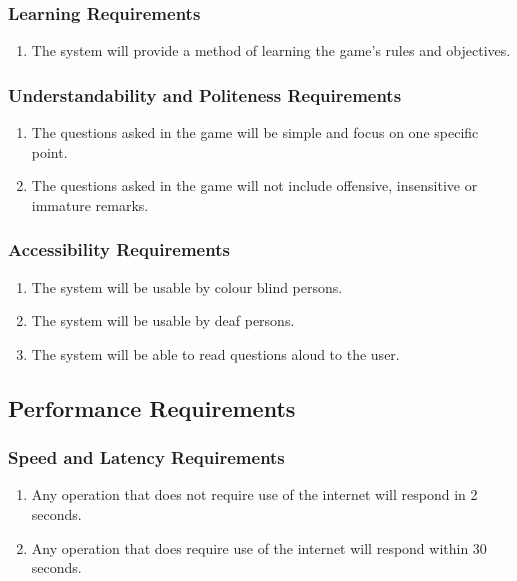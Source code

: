 \documentclass[titlepage]{article}
\begin{document}
\subsubsection{Learning Requirements}
\label{ssub:learning_requirements}
\begin{enumerate}[{UH}1. ]
	\item
	The system will provide a method of learning the game's rules and objectives.
\end{enumerate}

\subsubsection{Understandability and Politeness Requirements}
\label{ssub:understandability_and_politeness_requirements}
\begin{enumerate}[{UH}1. ]
	\item 
	The questions asked in the game will be simple and focus on one specific point. %
	\item
	The questions asked in the game will not include offensive, insensitive or immature remarks.
\end{enumerate}

\subsubsection{Accessibility Requirements}
\label{ssub:accessibility_requirements}
\begin{enumerate}[{UH}1. ]
	\item 
	The system will be usable by colour blind persons.
	\item
	The system will be usable by deaf persons.
	\item
	The system will be able to read questions aloud to the user.
\end{enumerate}


\subsection{Performance Requirements}
\label{sub:performance_requirements}


\subsubsection{Speed and Latency Requirements}
\label{ssub:speed_and_latency_requirements}
\begin{enumerate}
\item
Any operation that does not require use of the internet will respond in 2 seconds.
\item
Any operation that does require use of the internet will respond within 30 seconds.
\end{enumerate}
\end{document}
